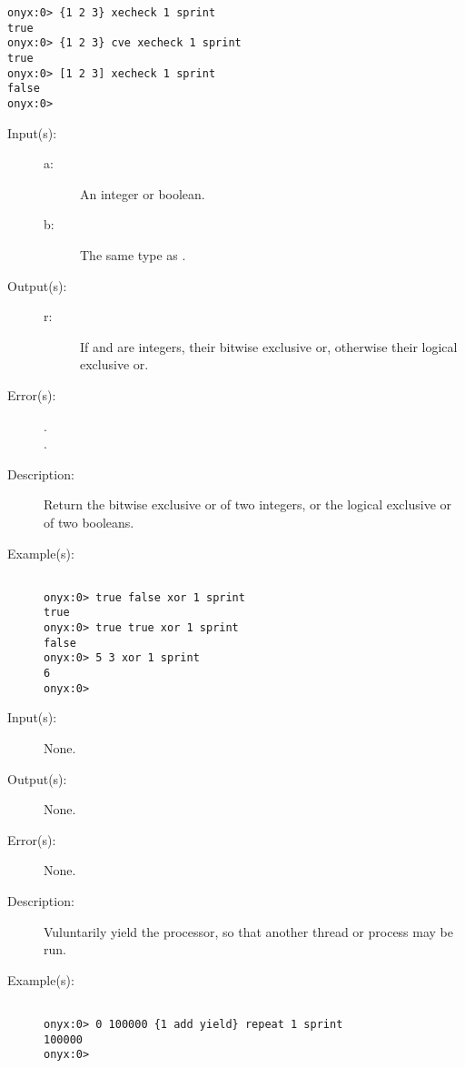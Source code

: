 \begin{description}
\begin{description}
\begin{verbatim}
onyx:0> {1 2 3} xecheck 1 sprint
true
onyx:0> {1 2 3} cve xecheck 1 sprint
true
onyx:0> [1 2 3] xecheck 1 sprint
false
onyx:0>
		\end{verbatim}
	\end{description}
\label{systemdict:xor}
\item[{\onyxop{a b}{xor}{r}}: ]
	\begin{description}\item[]
	\item[Input(s): ]
		\begin{description}\item[]
		\item[a: ]
			An integer or boolean.
		\item[b: ]
			The same type as .
		\end{description}
	\item[Output(s): ]
		\begin{description}\item[]
		\item[r: ]
			If  and  are integers, their bitwise
			exclusive or, otherwise their logical exclusive or.
		\end{description}
	\item[Error(s): ]
		\begin{description}\item[]
		\item[.]
		\item[.]
		\end{description}
	\item[Description: ]
		Return the bitwise exclusive or of two integers, or the logical
		exclusive or of two booleans.
	\item[Example(s): ]\begin{verbatim}

onyx:0> true false xor 1 sprint
true
onyx:0> true true xor 1 sprint
false
onyx:0> 5 3 xor 1 sprint
6
onyx:0>
		\end{verbatim}
	\end{description}
\label{systemdict:yield}
\item[{\onyxop{--}{yield}{--}}: ]
	\begin{description}\item[]
	\item[Input(s): ] None.
	\item[Output(s): ] None.
	\item[Error(s): ] None.
	\item[Description: ]
		Vuluntarily yield the processor, so that another thread or
		process may be run.
	\item[Example(s): ]\begin{verbatim}

onyx:0> 0 100000 {1 add yield} repeat 1 sprint
100000
onyx:0>
		\end{verbatim}
	\end{description}
\end{description}
